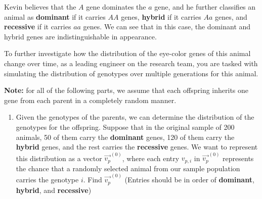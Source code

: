 Kevin believes that the $A$ gene dominates the $a$ gene, and he further classifies an animal as \textbf{dominant} if it carries $AA$ genes, \textbf{hybrid} if it carries $Aa$ genes, and \textbf{recessive} if it carries $aa$ genes. We can see that in this case, the dominant and hybrid genes are indistinguishable in appearance.

To further investigate how the distribution of the eye-color genes of this animal change over time, as a leading engineer on the research team, you are tasked with simulating the distribution of genotypes over multiple generations for this animal.

\textbf{Note: } for all of the following parts, we assume that each offspring inherits one gene from each parent in a completely random manner. 
\begin{enumerate}
    \item Given the genotypes of the parents, we can determine the distribution of the genotypes for the offspring. Suppose that in the original sample of 200 animals, 50 of them carry the \textbf{dominant} genes, 120 of them carry the \textbf{hybrid} genes, and the rest carries the \textbf{recessive} genes. We want to represent this distribution as a vector $\vec{v_p}^{(0)}$, where each entry $v_{p, i}$ in $\vec{v_p}^{(0)}$ represents the chance that a randomly selected animal from our sample population carries the genotype $i$. Find $\vec{v_p}^{(0)}$ (Entries should be in order of \textbf{dominant}, \textbf{hybrid}, and \textbf{recessive})
    
    


\end{enumerate}
